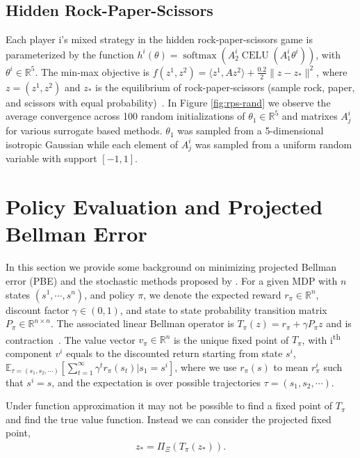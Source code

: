 \documentclass{article} %
\theoremstyle{definition}
\newcommand{\reals}{\mathbb{R}}
\newcommand{\softmax}{\operatorname{softmax}}
\newcommand{\celu}{\operatorname{CELU}}
\newcommand{\inner}[2]{\langle #1, #2 \rangle}
\newcommand{\expect}[2][]{\mathbb{E}_{#1}\left[ #2\right]}
\begin{document}
\subsection{Hidden Rock-Paper-Scissors}\label{sec:appendix-rps}
Each player i's mixed strategy in the hidden rock-paper-scissors game is parameterized by the function $h^i(\theta) = \softmax(A_2^i \celu(A_1^i \theta^i))$, with  $\theta^i \in \reals^5$.
The min-max objective  is $f(z^1,z^2) = \inner{z^1}{A z^2} + \frac{0.2}{2}\|z-z_\ast\|^2$, where $z = (z^1,z^2)$ and $z_\ast$ is the equilibrium of rock-paper-scissors (sample rock, paper, and scissors with equal probability)~\citep{sakos2024exploiting}.
In Figure \ref{fig:rps-rand} we observe the average convergence across 100 random initializations of $\theta_1 \in \reals^5$ and matrixes $A_j^i$ for various surrogate based methods.
$\theta_1$ was sampled from a 5-dimensional isotropic Gaussian while each element of $A_j^i$ was sampled from a uniform random variable with support $[-1,1]$.

\section{Policy Evaluation and Projected Bellman Error}\label{sec:appendix-PBE}

In this section we provide some background on minimizing projected Bellman error (PBE) and the stochastic methods proposed by \citet{bertsekas2009projected}.
For a given MDP with $n$ states $(s^1, \cdots, s^n)$, and policy $\pi$, we denote the expected reward $r_\pi \in \reals^n$, discount factor $\gamma \in (0,1)$, and state to state probability transition matrix $P_\pi \in \reals^{n \times n}$.
The associated linear Bellman operator is $T_{\pi}(z) = r_{\pi} +\gamma P_{\pi}z$ and is contraction~\cite{bertsekas2012dynamic}. The value vector $v_{\pi} \in \reals^n$ is the unique fixed point of $T_{\pi}$, with i\textsuperscript{th} component $v^i$ equals to the discounted return starting from state $s^i$, $\expect[\tau = (s_1, s_2, \cdots)]{\sum_{t=1}^\infty \gamma ^t r_{\pi}(s_t)|s_1 = s^i}$, where we use $r_{\pi}(s)$ to mean $r_\pi^i$ such that $s^i = s$, and the expectation is over possible trajectories $\tau = (s_1, s_2, \cdots)$.

Under function approximation it may not be possible to find a fixed point of $T_{\pi}$ and find the true value function.
Instead we can consider the projected fixed point,
\begin{align}\label{eq:proj-fixed-point}
    z_{\ast} = \Pi_{\Xi}(T_{\pi}(z_\ast)).
\end{align}
\end{document}
